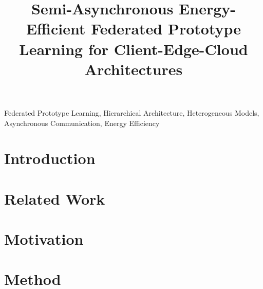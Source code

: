 \documentclass[journal]{IEEEtran}
\begin{document}
\title{Semi-Asynchronous Energy-Efficient Federated Prototype Learning for Client-Edge-Cloud Architectures}




\maketitle

\begin{abstract}

\end{abstract}

\begin{IEEEkeywords}
  Federated Prototype Learning, Hierarchical Architecture, Heterogeneous Models, Asynchronous Communication, Energy Efficiency
\end{IEEEkeywords}

\section{Introduction}

\section{Related Work}

\section{Motivation}

\section{Method}
\end{document}
